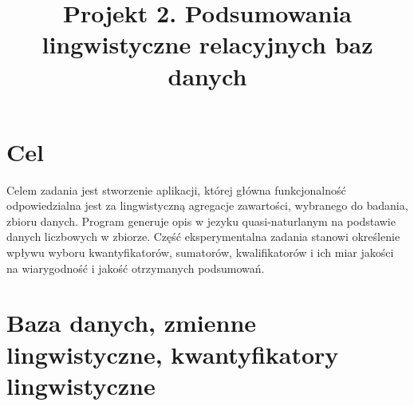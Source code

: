 \documentclass{classrep}
\author{
  \studentinfo{Daria Rogowska}{229989} \and
  \studentinfo{Mateusz Srebnik}{230004} }
\title{Projekt 2.  Podsumowania lingwistyczne relacyjnych baz danych}
\begin{document}
\maketitle


\section{Cel}
Celem zadania jest stworzenie aplikacji, której główna funkcjonalność odpowiedzialna jest za lingwistyczną agregacje zawartości, wybranego do badania, zbioru danych\cite{database}. 
Program generuje opis w jezyku quasi-naturlanym na podstawie danych liczbowych w zbiorze. Część eksperymentalna zadania stanowi określenie 
wpływu wyboru kwantyfikatorów, sumatorów, kwalifikatorów i ich miar jakości na wiarygodność i jakość otrzymanych podsumowań. 




\section{Baza danych, zmienne lingwistyczne, kwantyfikatory lingwistyczne}
\end{document}
